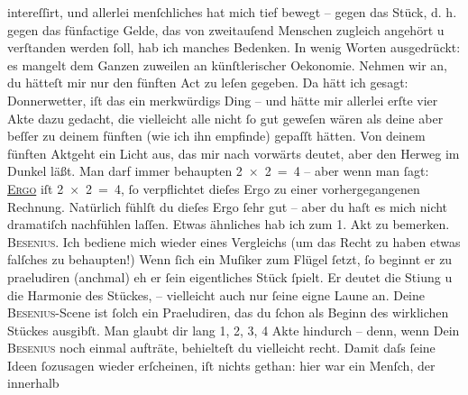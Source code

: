                intereſſirt, und allerlei menſchliches hat mich tief bewegt – gegen das Stück, d. h. gegen das
               fünfactige Gelde, das von zweitauſend Menschen zugleich angehört u verſtanden werden{ }ſoll, hab ich manches Bedenken. In wenig Worten ausgedrückt: {\pb}es mangelt dem Ganzen
               zuweilen an künſtlerischer Oekonomie. Nehmen wir an, du hätteſt mir nur den fünften
               Act zu leſen gegeben. Da hätt ich gesagt: Donnerwetter, iſt das ein merkwürdigs Ding
               – und hätte mir allerlei erſte vier Akte dazu gedacht, die vielleicht alle nicht{ }ſo
               gut geweſen wären als deine  aber beſſer zu deinem fünften (wie ich ihn empfinde) gepaſſt hätten.
               Von deinem fünften Aktgeht ein Licht aus,
               das mir nach vorwärts deutet, aber den Herweg im Dunkel läßt. Man darf immer
               behaupten 2 × 2 = 4 – aber wenn man{ }ſagt: \textsc{\uline{Ergo}} iſt 2 × 2 = 4,{ }ſo verpflichtet dieſes Ergo zu einer vorhergegangenen Rechnung.
               Natürlich fühlſt du dieſes Ergo{ }ſehr gut – aber du haſt es mich nicht dramatiſch
               nachfühlen laſſen. Etwas ähnliches hab ich zum 1. Akt zu bemerken. \textsc{Besenius}. {\pb}Ich bediene
               mich wieder eines Vergleichs (um das Recht zu haben etwas falſches zu behaupten!)
               Wenn{ }ſich ein Muſiker zum Flügel{ }ſetzt,{ }ſo beginnt er zu praeludiren (anchmal) eh er{ }ſein eigentliches Stück{ }ſpielt. Er deutet die Sti{\geminationm}ung u die Harmonie des Stückes, – vielleicht auch nur{ }ſeine eigne Laune an. Deine \textsc{Besenius}-Scene ist{ }ſolch ein Praeludiren, das du{ }ſchon als Beginn des wirklichen Stückes
               ausgibſt. Man {\pb}glaubt
               dir lang {\dotstwo} 1, 2, 3, 4 Akte hindurch – denn, wenn Dein \textsc{Besenius} noch einmal aufträte, behielteſt du vielleicht recht. Damit daſs{ }ſeine Ideen{ }ſozusagen wieder erſcheinen, iſt nichts gethan: hier war ein Menſch, der innerhalb
